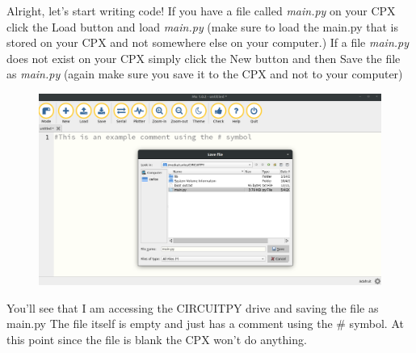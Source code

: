 Alright, let’s start writing code! If you have a file called {\it main.py}
on your CPX click the Load button and load {\it main.py} (make sure to load
the main.py that is stored on your CPX and not somewhere else on your
computer.) If a file {\it main.py} does not exist on your CPX simply click
the New button and then Save the file as {\it main.py} (again make sure you
save it to the CPX and not to your computer) 
\begin{figure}[H]
  \begin{center}
    \includegraphics[width=\textwidth]{Figures/Mu2.png}
  \end{center}
\end{figure}
You’ll see that I am accessing the CIRCUITPY drive and saving the file
as main.py The file itself is empty and just has a comment using the #
symbol. At this point since the file is blank the CPX won’t do
anything.

